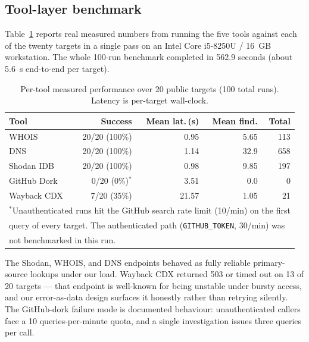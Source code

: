 \documentclass[conference]{IEEEtran}
\begin{document}
\subsection{Tool-layer benchmark}
Table~\ref{tab:tool-bench} reports real measured numbers from running
the five tools against each of the twenty targets in a single pass on
an Intel Core i5-8250U / 16~GB workstation. The whole 100-run
benchmark completed in 562.9 seconds (about 5.6~s end-to-end per
target).

\begin{table}[t]
\centering
\caption{Per-tool measured performance over 20 public targets
(100 total runs). Latency is per-target wall-clock.}
\label{tab:tool-bench}
\renewcommand{\arraystretch}{1.18}
\begin{tabular}{lrrrr}
\toprule
\textbf{Tool}        & \textbf{Success} & \textbf{Mean lat.\,(s)} & \textbf{Mean find.} & \textbf{Total} \\
\midrule
WHOIS                & 20/20 (100\%)    & 0.95                    & 5.65                & 113            \\
DNS                  & 20/20 (100\%)    & 1.14                    & 32.9                & 658            \\
Shodan IDB           & 20/20 (100\%)    & 0.98                    & 9.85                & 197            \\
GitHub Dork          & 0/20 (0\%)$^{*}$ & 3.51                    & 0.0                 & 0              \\
Wayback CDX          & 7/20 (35\%)      & 21.57                   & 1.05                & 21             \\
\bottomrule
\multicolumn{5}{l}{\footnotesize $^{*}$Unauthenticated runs hit the
GitHub search rate limit (10/min) on the first}\\
\multicolumn{5}{l}{\footnotesize query of every target. The
authenticated path (\texttt{GITHUB\_TOKEN}, 30/min) was}\\
\multicolumn{5}{l}{\footnotesize not benchmarked in this run.}\\
\end{tabular}
\end{table}

The Shodan, WHOIS, and DNS endpoints behaved as fully reliable
primary-source lookups under our load. Wayback CDX returned 503 or
timed out on 13 of 20 targets — that endpoint is well-known for being
unstable under bursty access, and our error-as-data design surfaces it
honestly rather than retrying silently. The GitHub-dork failure mode
is documented behaviour: unauthenticated callers face a 10
queries-per-minute quota, and a single investigation issues three
queries per call.
\end{document}
